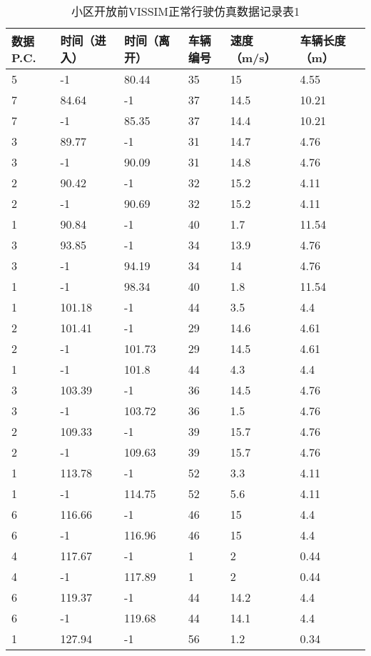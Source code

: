 \begin{table*}[h!]
  \centering
  \small
  \caption{小区开放前VISSIM正常行驶仿真数据记录表1}
\begin{tabular*}{\linewidth}{p{50pt}<{\centering}p{50pt}<{\centering}
p{60pt}<{\centering}p{60pt}<{\centering}p{60pt}<{\centering}p{70pt}<{\centering}}
\toprule
 数据P.C. & 时间（进入） & 时间（离开） & 车辆编号& 速度（m/s） & 车辆长度（m） \\
\midrule
5 & -1 & 80.44 & 35 & 15 & 4.55 \\
7 & 84.64 & -1 & 37 & 14.5 & 10.21 \\
7 & -1 & 85.35 & 37 & 14.4 & 10.21 \\
3 & 89.77 & -1 & 31 & 14.7 & 4.76 \\
3 & -1 & 90.09 & 31 & 14.8 & 4.76 \\
2 & 90.42 & -1 & 32 & 15.2 & 4.11 \\
2 & -1 & 90.69 & 32 & 15.2 & 4.11 \\
1 & 90.84 & -1 & 40 & 1.7 & 11.54 \\
3 & 93.85 & -1 & 34 & 13.9 & 4.76 \\
3 & -1 & 94.19 & 34 & 14 & 4.76 \\
1 & -1 & 98.34 & 40 & 1.8 & 11.54 \\
1 & 101.18 & -1 & 44 & 3.5 & 4.4 \\
2 & 101.41 & -1 & 29 & 14.6 & 4.61 \\
2 & -1 & 101.73 & 29 & 14.5 & 4.61 \\
1 & -1 & 101.8 & 44 & 4.3 & 4.4 \\
3 & 103.39 & -1 & 36 & 14.5 & 4.76 \\
3 & -1 & 103.72 & 36 & 1.5 & 4.76 \\
2 & 109.33 & -1 & 39 & 15.7 & 4.76 \\
2 & -1 & 109.63 & 39 & 15.7 & 4.76 \\
1 & 113.78 & -1 & 52 & 3.3 & 4.11 \\
1 & -1 & 114.75 & 52 & 5.6 & 4.11 \\
6 & 116.66 & -1 & 46 & 15 & 4.4 \\
6 & -1 & 116.96 & 46 & 15 & 4.4 \\
4 & 117.67 & -1 & 1 & 2 & 0.44 \\
4 & -1 & 117.89 & 1 & 2 & 0.44 \\
6 & 119.37 & -1 & 44 & 14.2 & 4.4 \\
6 & -1 & 119.68 & 44 & 14.1 & 4.4 \\
1 & 127.94 & -1 & 56 & 1.2 & 0.34 \\

\end{tabular*}
\end{table*}
